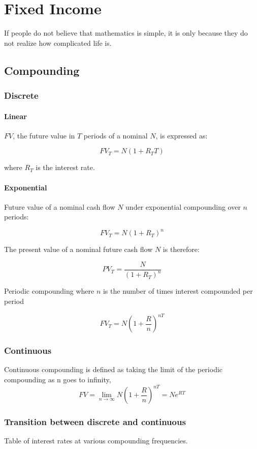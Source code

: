 \chapter{Fixed Income}\label{chap:fi}
\begin{fquote}If people do not believe that mathematics is simple, it is only because they do not realize how complicated life is.
\end{fquote}

\section{Compounding}

\subsection{Discrete}
\subsubsection{Linear}

$FV$, the future value in $T$ periods of a nominal $N$, is expressed as:

\[
FV_T = N(1+R_TT)
\]

where $R_T$ is the interest rate.

\subsubsection{Exponential}

Future value of a nominal cash flow $N$ under exponential compounding over
$n$ periods:

\[ FV_T = N(1+R_T)^n \]

The present value of a nominal future cash flow $N$ is therefore:

\[ PV_T = \frac{N}{(1+R_T)^n} \]

Periodic compounding where $n$ is the number of times interest compounded per period

\[ 
FV_T=N\left( 1 + \frac{R}{n}  \right)^{nT}
\]

\subsection{Continuous}
Continuous compounding is defined as taking the limit of the periodic compounding as n goes to infinity,
\[ 
FV=\lim_{n \to \infty} N \left(1+\frac{R}{n}\right)^{nT}=Ne^{RT}
\]

\subsection{Transition between discrete and continuous}
Table of interest rates at various compounding frequencies.

